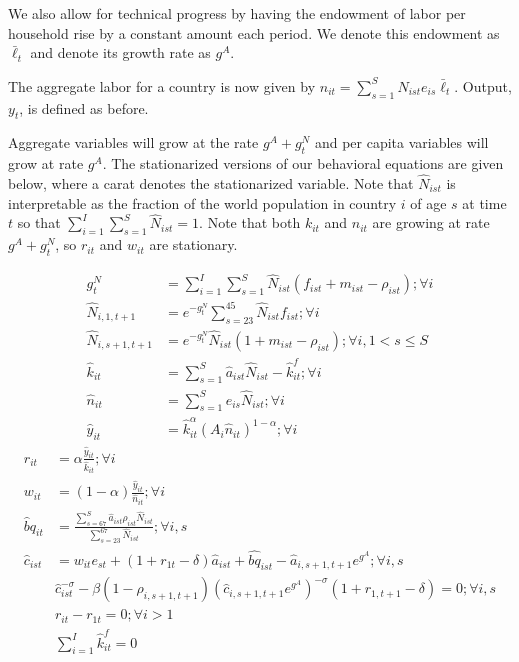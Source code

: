 \documentclass[letterpaper,12pt]{article}
\theoremstyle{definition}
\numberwithin{equation}{section}
\begin{document}
\begin{spacing}{1.5}
	We also allow for technical progress by having the endowment of labor per household rise by a constant amount each period.  We denote this endowment as $\bar \ell_t$ and denote its growth rate as $g^A$.

	The aggregate labor for a country is now given by $n_{it} = \sum_{s=1}^S N_{ist} e_{is} \bar \ell_t$.  Output, $y_t$, is defined as before. 

	Aggregate variables will grow at the rate $g^A+g^N_t$ and per capita variables will grow at rate $g^A$.  The stationarized versions of our behavioral equations are given below, where a carat denotes the stationarized variable.  Note that $\hat N_{ist}$ is interpretable as the fraction of the world population in country $i$ of age $s$ at time $t$ so that $\sum_{i=1}^I \sum_{s=1}^S \hat N_{ist} = 1$.  Note that both $k_{it}$ and $n_{it}$ are growing at rate $g^A+g^N_t$, so $r_{it}$ and $w_{it}$ are stationary.

	\begin{align}
		g^N_t & = \sum_{i=1}^I \sum_{s=1}^S \hat N_{ist} (f_{ist}+m_{ist}-\rho_{ist}) ; \forall i\\
		\hat N_{i,1,t+1} & = e^{-g^N_t}\sum_{s=23}^{45} \hat N_{ist} f_{ist} ; \forall i\\
		\hat N_{i,s+1,t+1} & = e^{-g^N_t}\hat N_{ist} (1+m_{ist}-\rho_{ist}); \forall i, 1<s\le S \\
		\hat k_{it} & = \sum_{s=1}^S \hat a_{ist} \hat N_{ist} - \hat k_{it}^f; \forall i \\
		\hat n_{it} & = \sum_{s=1}^S e_{is} \hat N_{ist}; \forall i \\
		\hat y_{it} & = \hat k_{it}^\alpha \left( A_{i} \hat n_{it} \right)^{1-\alpha} ; \forall i
	\end{align}
	\begin{align}
		r_{it} & = \alpha \frac{\hat y_{it}}{\hat k_{it}}; \forall i \\
		w_{it} & = (1-\alpha) \frac{\hat y_{it}}{\hat n_{it}}; \forall i \\
		\hat bq_{it} & = \frac{\sum_{s=67}^S \hat a_{ist} \rho_{ist} \hat N_{ist}}{\sum_{s=23}^{67} \hat N_{ist}} ; \forall i,s \\
	    \hat c_{ist} & = w_{it} e_{st} + (1+r_{1t}-\delta)\hat a_{ist} + \hat{bq}_{ist} - \hat a_{i,s+1,t+1}e^{g^A} ; \forall i,s \\
		& \hat c_{ist}^{-\sigma} - \beta (1-\rho_{i,s+1,t+1}) \left(\hat c_{i,s+1,t+1} e^{g^A}\right)^{-\sigma}(1+r_{1,t+1}-\delta) = 0; \forall i,s \\ 
		& r_{it} - r_{1t} = 0; \forall i>1 \\
		& \sum_{i=1}^I \hat k^f_{it} = 0
	\end{align}


\end{spacing}
\end{document}
